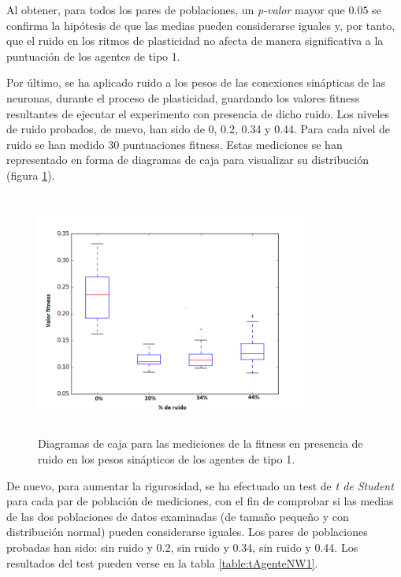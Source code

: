 Al obtener, para todos los pares de poblaciones, un \textit{p-valor} mayor que $0.05$ se confirma la hipótesis de que las medias pueden considerarse iguales y, por tanto, que el ruido en los ritmos de plasticidad no afecta de manera significativa a la puntuación
de los agentes de tipo 1.

Por último, se ha aplicado ruido a los pesos de las conexiones sinápticas de las neuronas, durante el proceso de plasticidad, guardando los valores fitness resultantes de ejecutar el experimento con presencia de dicho ruido. Los niveles de ruido probados,
de nuevo, han sido de 0, 0.2, 0.34 y 0.44. Para cada nivel de ruido se han medido 30 puntuaciones fitness. Estas mediciones se han representado en forma de diagramas de caja para visualizar su distribución (figura \ref{fig:boxPlotNW1}).

\begin{figure}[H]
    \centering
    \includegraphics[width=0.8\textwidth,height=8cm]{Imagenes/BoxPlotNW1}
    \caption{Diagramas de caja para las mediciones de la fitness en presencia de ruido en los pesos sinápticos de los agentes de tipo 1.}
    \label{fig:boxPlotNW1}
\end{figure}

De nuevo, para aumentar la rigurosidad, se ha efectuado un test de \textit{t de Student} para cada par de población de mediciones, con el fin de comprobar si las medias de las dos poblaciones de datos examinadas (de tamaño pequeño y con distribución normal) pueden considerarse iguales.
Los pares de poblaciones probadas han sido: sin ruido y 0.2, sin ruido y 0.34, sin ruido y 0.44. Los resultados del test pueden verse en la tabla \ref{table:tAgenteNW1}.

